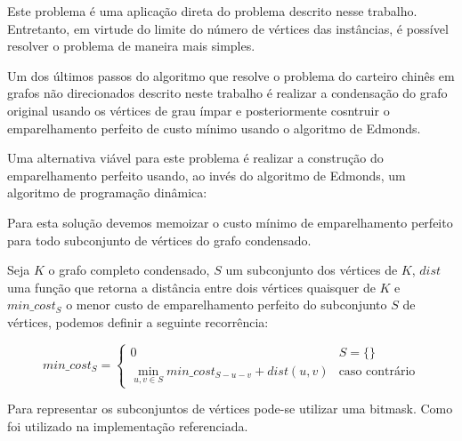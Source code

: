         Este problema é uma aplicação direta do problema descrito nesse trabalho. 
        Entretanto, em virtude do limite do número de vértices das instâncias, é possível resolver o problema de maneira mais simples.

        Um dos últimos passos do algoritmo que resolve o problema do carteiro chinês em grafos não direcionados descrito neste trabalho é realizar a condensação do grafo original usando os vértices de grau ímpar e posteriormente cosntruir o emparelhamento perfeito de custo mínimo usando o algoritmo de Edmonds.

        Uma alternativa viável para este problema é realizar a construção do emparelhamento perfeito usando, ao invés do algoritmo de Edmonds, um algoritmo de programação dinâmica:

         Para esta solução devemos memoizar o custo mínimo de emparelhamento perfeito para todo subconjunto de vértices do grafo condensado.

        Seja $K$ o grafo completo condensado, $S$ um subconjunto dos vértices de $K$, $dist$ uma função que retorna a distância entre dois vértices quaisquer de $K$ e $min\_cost_S$ o menor custo de emparelhamento perfeito do subconjunto $S$ de vértices, podemos definir a seguinte recorrência:

        \[
            min\_cost_S = 
            \begin{cases} 
                0 & S = \{ \} \\
                \min_{u, v \in S} min\_cost_{S - u - v} + dist(u, v) & \text{caso contrário}
            \end{cases}
        \]

        Para representar os subconjuntos de vértices pode-se utilizar uma bitmask.
        Como foi utilizado na implementação referenciada.
